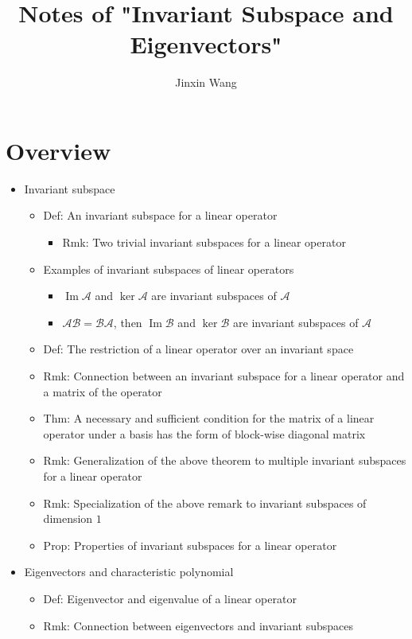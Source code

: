 \documentclass[onecolumn]{ctexart}
\title{Notes of "Invariant Subspace and Eigenvectors"}
\author{Jinxin Wang}
\date{}
\DeclareMathOperator{\Img}{Im}
\begin{document}
\maketitle

\section{Overview}
\begin{itemize}
  \item Invariant subspace
  \begin{itemize}
    \item Def: An invariant subspace for a linear operator
    \begin{itemize}
      \item Rmk: Two trivial invariant subspaces for a linear operator
    \end{itemize}
    \item Examples of invariant subspaces of linear operators
    \begin{itemize}
      \item $\Img \mathcal{A}$ and $\ker \mathcal{A}$ are invariant subspaces of $\mathcal{A}$
      \item $\mathcal{A}\mathcal{B} = \mathcal{B}\mathcal{A}$, then $\Img \mathcal{B}$ and $\ker \mathcal{B}$ are invariant subspaces of $\mathcal{A}$
    \end{itemize}
    \item Def: The restriction of a linear operator over an invariant space
    \item Rmk: Connection between an invariant subspace for a linear operator and a matrix of the operator
    \item Thm: A necessary and sufficient condition for the matrix of a linear operator under a basis has the form of block-wise diagonal matrix
    \item Rmk: Generalization of the above theorem to multiple invariant subspaces for a linear operator
    \item Rmk: Specialization of the above remark to invariant subspaces of dimension $1$
    \item Prop: Properties of invariant subspaces for a linear operator
  \end{itemize}
  \item Eigenvectors and characteristic polynomial
  \begin{itemize}
    \item Def: Eigenvector and eigenvalue of a linear operator
    \item Rmk: Connection between eigenvectors and invariant subspaces

\end{itemize}
\end{itemize}
\end{document}
